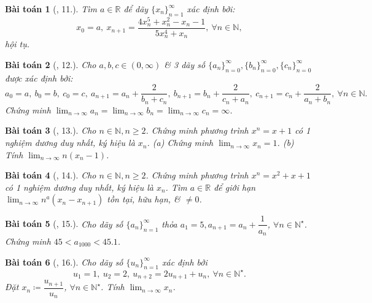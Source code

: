 \documentclass[oneside]{book}
\newtheorem{baitoan}{Bài toán}
\begin{document}
\begin{baitoan}[\cite{TLCT_dai_so_giai_tich_11}, 11.]
	Tìm $a\in\mathbb{R}$ để dãy $\{x_n\}_{n=1}^\infty$ xác định bởi:
	\begin{equation*}
		x_0 = a,\ x_{n+1} = \frac{4x_n^5 + x_n^2 - x_n - 1}{5x_n^4 + x_n},\ \forall n\in\mathbb{N},
	\end{equation*}
	hội tụ.
\end{baitoan}

\begin{baitoan}[\cite{TLCT_dai_so_giai_tich_11}, 12.]
	Cho $a,b,c\in(0,\infty)$ \& 3 dãy số $\{a_n\}_{n=0}^\infty,\{b_n\}_{n=0}^\infty,\{c_n\}_{n=0}^\infty$ được xác định bởi:
	\begin{equation*}
		a_0 = a,\ b_0 = b,\ c_0 = c,\ a_{n+1} = a_n + \frac{2}{b_n + c_n},\ b_{n+1} = b_n + \frac{2}{c_n + a_n},\ c_{n+1} = c_n + \frac{2}{a_n + b_n},\ \forall n\in\mathbb{N}.
	\end{equation*}
	Chứng minh $\lim_{n\to\infty} a_n = \lim_{n\to\infty} b_n = \lim_{n\to\infty} c_n = \infty$.
\end{baitoan}

\begin{baitoan}[\cite{TLCT_dai_so_giai_tich_11}, 13.]
	Cho $n\in\mathbb{N},n\ge2$. Chứng minh phương trình $x^n = x + 1$ có 1 nghiệm dương duy nhất, ký hiệu là $x_n$. (a) Chứng minh $\lim_{n\to\infty} x_n = 1$. (b) Tính $\lim_{n\to\infty} n(x_n - 1)$.
\end{baitoan}

\begin{baitoan}[\cite{TLCT_dai_so_giai_tich_11}, 14.]
	Cho $n\in\mathbb{N},n\ge2$. Chứng minh phương trình $x^n = x^2 + x + 1$ có 1 nghiệm dương duy nhất, ký hiệu là $x_n$. Tìm $a\in\mathbb{R}$ để giới hạn $\lim_{n\to\infty} n^a(x_n - x_{n+1})$ tồn tại, hữu hạn, \& $\ne0$.
\end{baitoan}

\begin{baitoan}[\cite{TLCT_dai_so_giai_tich_11}, 15.]
	Cho dãy số $\{a_n\}_{n=1}^\infty$ thỏa $a_1 = 5,a_{n+1} = a_n + \dfrac{1}{a_n}$, $\forall n\in\mathbb{N}^\star$. Chứng minh $45 < a_{1000} < 45.1$.
\end{baitoan}

\begin{baitoan}[\cite{TLCT_dai_so_giai_tich_11}, 16.]
	Cho dãy số $\{u_n\}_{n=1}^\infty$ xác định bởi
	\begin{equation*}
		u_1 = 1,\ u_2 = 2,\ u_{n+2} = 2u_{n+1} + u_n,\ \forall n\in\mathbb{N}^\star.
	\end{equation*}
	Đặt $x_n\coloneqq\dfrac{u_{n+1}}{u_n}$, $\forall n\in\mathbb{N}^\star$. Tính $\lim_{n\to\infty} x_n$.
\end{baitoan}
\end{document}
